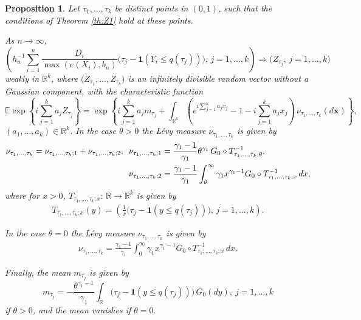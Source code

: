 \documentclass[12pt]{amsart}
\newcommand{\bbr}{\mathbb{R}}
\newcommand{\1}{\mathbbm{1}}
\newcommand{\0}{\mathbf{0}}
\newcommand{\one}{\mathbf{1}}
\newcommand{\E}{\mathbb{E}}
\theoremstyle{plain}
\newtheorem{proposition}[theorem]{Proposition}
\theoremstyle{definition}
\newcommand{\bx}{\mathbf{x}}
\begin{document}
\begin{proposition} \label{pr:z1}
Let $\tau_1,\ldots, \tau_k$ be distinct points in $(0,1)$, such that 
 the conditions of Theorem \ref{th:Z1} hold at these points. 
 
 \smallskip 
     As $n\to\infty$, 
  $$
  \left( h_n^{-1} \sum_{i=1}^n \frac{D_i}{\max(e(X_i),b_n)}
  \bigl( \tau_j-\one(Y_i\leq q(\tau_j))\bigr), \, j=1,\ldots, k\right) 
 \Rightarrow \bigl( Z_{\tau_j}, \, j=1,\ldots, k\bigr)
$$
weakly in $\bbr^k$, where $\bigl( Z_{\tau_1},\ldots, Z_{\tau_k}\bigr)$ is an
infinitely divisible random vector 
without a Gaussian component, with the characteristic function
$$
\E\exp\left\{ i\sum_{j=1}^k a_j Z_{\tau_j}\right\} = \exp\left\{
  i\sum_{j=1}^k a_j
  m_{\tau_j} + \int_{\bbr^k} \left(e^{i\sum_{j=1}^k a_j x_j} 
  -1 -i\sum_{j=1}^k a_j x_j\right)\, \nu_{\tau_1,\ldots, \tau_k}(d\bx)\right\}, 
$$
$(a_1,\ldots, a_k)\in\bbr^k$.   In the case $\theta >0$ the L\'evy measure
$\nu_{\tau_1,\ldots,\tau_k}$  is given by 
  \begin{align*}
\nu_{\tau_1,\ldots,
    \tau_k}=\nu_{\tau_1,\ldots,\tau_k;1}+\nu_{\tau_1,\ldots,\tau_k;
    2},  \ \ &\nu_{\tau_1,\ldots,\tau_k; 1}= 
  \frac{\gamma_1-1}{\gamma_1}\theta^{\gamma_1}  \, 
                G_0\circ T_{\tau_1,\ldots, \tau_k;\theta}^{-1},
    \\
  \notag &\nu_{\tau_1,\ldots,\tau_k; 2}= \frac{\gamma_1-1}{\gamma_1} \int_\theta^\infty \gamma_1
           x^{\gamma_1-1} G_0\circ T_{\tau_1,\ldots,\tau_k; x}^{-1}\,  dx, 
\end{align*}
where for   $x>0$, $ T_{\tau_1,\ldots,\tau_k;x}:\, \bbr\to\bbr^k$ is given by 
\begin{align*}
T_{\tau_1,\ldots,\tau_k;x}(y)  =  \left( \frac{1}{x} \bigl(
  \tau_j-\one(y\leq q(\tau_j))\bigr), \, j=1,\ldots, k\right). 
\end{align*}

In the case $\theta=0$ the L\'evy measure
$\nu_{\tau_1,\ldots,\tau_k}$  is given by
%
\begin{align*} 
\nu_{\tau_1,\ldots,
    \tau_k} = \frac{\gamma_1-1}{\gamma_1} \int_0^\infty \gamma_1
           x^{\gamma_1-1} G_0\circ T_{\tau_1,\ldots,\tau_k; x}^{-1}\,
  dx.
 \end{align*}

Finally, the mean $m_{\tau_j}$ is given by
\begin{equation} \label{e:ass.bias}
m_{\tau_j} =-\frac{\theta^{\gamma_1-1}}{\gamma_1} \int_\bbr 
  \bigl( \tau_j-\one(y\leq q(\tau_j))\bigr)\, G_0(dy), \ j=1,\ldots, k
\end{equation}
if $\theta>0$, 
and the mean vanishes if $\theta=0$. 


\end{proposition}
\end{document}
